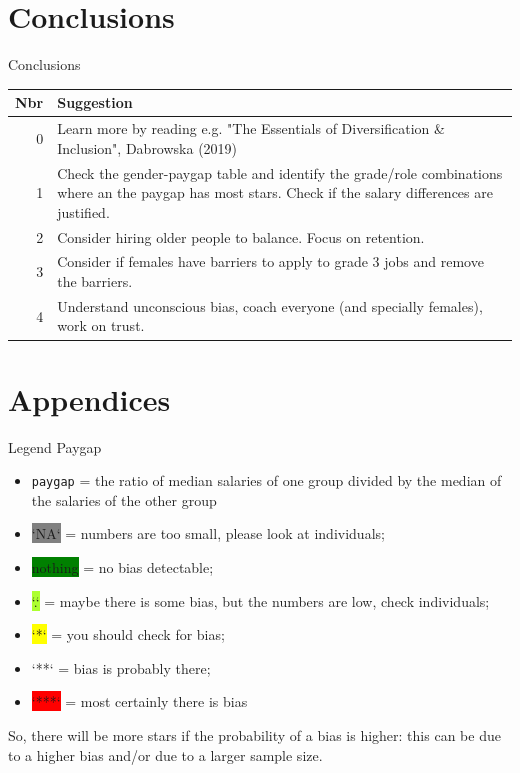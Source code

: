 \documentclass[
  ignorenonframetext,
  usenames,
  dvipsnames]{beamer}
\providecommand{\tightlist}{%
  \setlength{\itemsep}{0pt}\setlength{\parskip}{0pt}}
\begin{document}
\hypertarget{conclusions}{%
\section{Conclusions}\label{conclusions}}

\begin{frame}{Conclusions}
\begin{tabular}{r|>{\raggedright\arraybackslash}p{22em}}
\hline
Nbr & Suggestion\\
\hline
0 & Learn more by reading e.g. "The Essentials of Diversification \& Inclusion", Dabrowska (2019)\\
\hline
1 & Check the gender-paygap table and identify the grade/role combinations where an the paygap has most stars. Check if the salary differences are justified.\\
\hline
2 & Consider hiring older people to balance. Focus on retention.\\
\hline
3 & Consider if females have barriers to apply to grade 3 jobs and remove the barriers.\\
\hline
4 & Understand unconscious bias, coach everyone (and specially females), work on trust.\\
\hline
\end{tabular}
\end{frame}

\hypertarget{appendices}{%
\section{Appendices}\label{appendices}}

\begin{frame}[fragile]{Legend Paygap}
\protect\hypertarget{legend-paygap}{}
\begin{itemize}
\tightlist
\item
  \texttt{paygap} = the ratio of median salaries of one group divided by
  the median of the salaries of the other group
\item
  \colorbox{Gray}{`NA`} = numbers are too small, please look at
  individuals;
\item
  \colorbox{green}{nothing} = no bias detectable;
\item
  \colorbox{GreenYellow}{`.`} = maybe there is some bias, but the
  numbers are low, check individuals;
\item
  \colorbox{Yellow}{`*`} = you should check for bias;
\item
  \colorbox{BurntOrange}{`**`} = bias is probably there;
\item
  \colorbox{red}{`***`} = most certainly there is bias
\end{itemize}

So, there will be more stars if the probability of a bias is higher:
this can be due to a higher bias and/or due to a larger sample size.
\end{frame}
\end{document}
